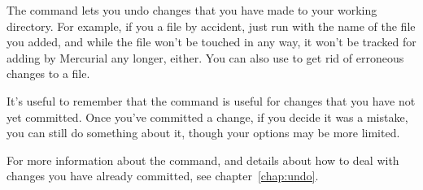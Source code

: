 The  command lets you undo changes that you have made to
your working directory.  For example, if you  a file by
accident, just run  with the name of the file you added,
and while the file won't be touched in any way, it won't be tracked
for adding by Mercurial any longer, either.  You can also use
 to get rid of erroneous changes to a file.

It's useful to remember that the  command is useful for
changes that you have not yet committed.  Once you've committed a
change, if you decide it was a mistake, you can still do something
about it, though your options may be more limited.

For more information about the  command, and details
about how to deal with changes you have already committed, see
chapter~\ref{chap:undo}.

